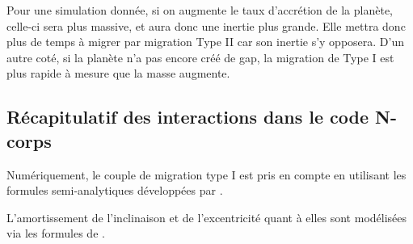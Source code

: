 \bigskip

Pour une simulation donnée, si on augmente le taux d'accrétion de la planète, celle-ci sera plus massive, et aura donc une inertie plus grande. Elle mettra donc plus de temps à migrer par migration Type II car son inertie s'y opposera. D'un autre coté, si la planète n'a pas encore créé de gap, la migration de Type I est plus rapide à mesure que la masse augmente. 


\subsection{Récapitulatif des interactions dans le code N-corps}
Numériquement, le couple de migration type I est pris en compte en utilisant les formules semi-analytiques développées par \cite{paardekooper2011torque}. 

L'amortissement de l'inclinaison et de l'excentricité quant à elles sont modélisées via les formules de \cite{cresswell2008three}.

